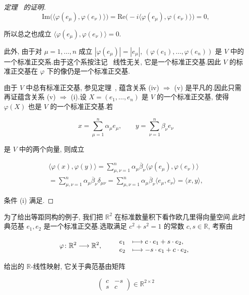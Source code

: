 \begin{proof}[定理~ 的证明]
\[
\mathrm{Im}\bigl(\bigl\langle \varphi(e_\mu), \varphi(e_\nu) \bigr\rangle\bigr) = \mathrm{Re}\bigl(-i \bigl\langle \varphi(e_\mu), \varphi(e_\nu) \bigr\rangle\bigr) = 0,
\]

所以总之也成立 $\bigl\langle \varphi(e_\mu), \varphi(e_\nu) \bigr\rangle = 0$.

此外, 由于对 $\mu = 1, \ldots, n$ 成立 $|\varphi(e_\mu)| = |e_\mu|$, $(\varphi(e_1), \ldots, \varphi(e_n))$ 是 $V$ 中的一个标准正交系.由于这个系按注记~ 线性无关, 它是一个标准正交基.因此 $V$ 的标准正交基在 $\varphi$ 下的像仍是一个标准正交基.

由于 $V$ 中总有标准正交基, 参见定理~, 蕴含关系 (iv) $\Longrightarrow$ (v) 是平凡的.因此只需再证蕴含关系 (v) $\Longrightarrow$ (i).设 $X = (e_1, \ldots, e_n)$ 是 $V$ 的一个标准正交基, 使得 $\varphi(X)$ 也是 $V$ 的一个标准正交基.若

\[
x = \sum_{\mu = 1}^{n} \alpha_\mu e_\mu, \qquad y = \sum_{\nu = 1}^{n} \beta_\nu e_\nu
\]

是 $V$ 中的两个向量, 则成立

\[
\begin{array}{c}
\bigl\langle \varphi(x), \varphi(y) \bigr\rangle = \sum_{\mu, \nu = 1}^{n} \alpha_\mu \overline{\beta}_\nu \bigl\langle \varphi(e_\mu), \varphi(e_\nu) \bigr\rangle \\
= \sum_{\mu, \nu = 1}^{n} \alpha_\mu \overline{\beta}_\nu \delta_{\mu \nu} = \sum_{\mu, \nu = 1}^{n} \alpha_\mu \overline{\beta}_\nu \bigl\langle e_\mu, e_\nu \bigr\rangle = \langle x, y \rangle,
\end{array}
\]

条件 (i) 满足.
\end{proof}

为了给出等距同构的例子, 我们把 $\mathbb{R}^2$ 在标准数量积下看作欧几里得向量空间.此时典范基 $e_1, e_2$ 是一个标准正交基.选取满足 $c^2 + s^2 = 1$ 的常数 $c, s \in \mathbb{R}$, 考察由

\[
\varphi \colon \mathbb{R}^2 \longrightarrow \mathbb{R}^2, \qquad \begin{array}{l l}
e_1 & \longmapsto c \cdot e_1 + s \cdot e_2, \\
e_2 & \longmapsto -s \cdot e_1 + c \cdot e_2,
\end{array}
\]

给出的 $\mathbb{R}$-线性映射, 它关于典范基由矩阵

\[
\begin{pmatrix} c & -s \\ s & c \end{pmatrix} \in \mathbb{R}^{2 \times 2}
\]

